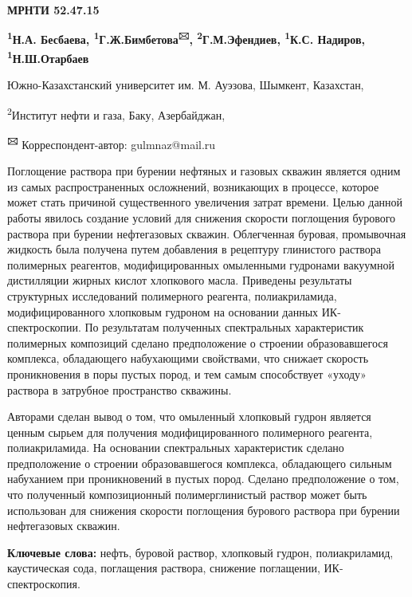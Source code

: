\newpage
{\bfseries МРНТИ 52.47.15}


\begin{center}
{\bfseries \textsuperscript{1}Н.А. Бесбаева, \textsuperscript{1}Г.Ж.Бимбетова\textsuperscript{🖂}, \textsuperscript{2}Г.М.Эфендиев, \textsuperscript{1}К.С. Надиров, \textsuperscript{1}Н.Ш.Отарбаев}

Южно-Казахстанский университет им. М. Ауэзова, Шымкент, Казахстан,

\textsuperscript{2}Институт нефти и газа, Баку, Азербайджан,

{\bfseries \textsuperscript{🖂}} Корреспондент-автор: gulmnaz@mail.ru
\end{center}

Поглощение раствора при бурении нефтяных и газовых скважин является
одним из самых распространенных осложнений, возникающих в процессе,
которое может стать причиной существенного увеличения затрат времени.
Целью данной работы явилось создание условий для снижения скорости
поглощения бурового раствора при бурении нефтегазовых скважин.
Облегченная буровая, промывочная жидкость была получена путем добавления
в рецептуру глинистого раствора полимерных реагентов, модифицированных
омыленными гудронами вакуумной дистилляции жирных кислот хлопкового
масла. Приведены результаты структурных исследований полимерного
реагента, полиакриламида, модифицированного хлопковым гудроном на
основании данных ИК-спектроскопии. По результатам полученных
спектральных характеристик полимерных композиций сделано предположение о
строении образовавшегося комплекса, обладающего набухающими свойствами,
что снижает скорость проникновения в поры пустых пород, и тем самым
способствует «уходу» раствора в затрубное пространство скважины.

Авторами сделан вывод о том, что омыленный хлопковый гудрон является
ценным сырьем для получения модифицированного полимерного реагента,
полиакриламида. На основании спектральных характеристик сделано
предположение о строении образовавшегося комплекса, обладающего сильным
набуханием при проникновений в пустых пород. Сделано предположение о
том, что полученный композиционный полимерглинистый раствор может быть
использован для снижения скорости поглощения бурового раствора при
бурении нефтегазовых скважин.

{\bfseries Ключевые слова:} нефть, буровой раствор, хлопковый гудрон,
полиакриламид, каустическая сода, поглащения раствора, снижение
поглащении, ИК-спектроскопия.

